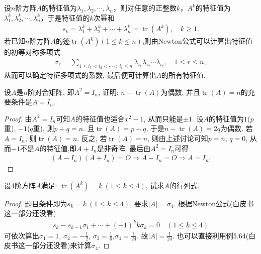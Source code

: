 \documentclass[../../main.tex]{subfiles}
\begin{document}
\begin{conclusion}
设$n$阶方阵$A$的特征值为$\lambda_1, \lambda_2, \cdots, \lambda_n$，则对任意的正整数$k$，$A^k$的特征值为$\lambda_1^k, \lambda_2^k, \cdots, \lambda_n^k$，于是特征值的$k$次幂和
\begin{align*}
s_k = \lambda_1^k + \lambda_2^k + \cdots + \lambda_n^k = \operatorname{tr}(A^k), \quad k \geqslant  1.
\end{align*}
若已知$n$阶方阵$A$的迹$\operatorname{tr}(A^k)(1\leqslant  k \leqslant  n)$,则由Newton公式可以计算出特征值的初等对称多项式
\begin{align*}
\sigma_r = \sum_{1 \leqslant  i_1 < i_2 < \cdots < i_r \leqslant  n} \lambda_{i_1} \lambda_{i_2} \cdots \lambda_{i_r}, \quad 1 \leqslant  r \leqslant  n,
\end{align*}
从而可以确定特征多项式的系数, 最后便可计算出$A$的所有特征值.
\end{conclusion}

\begin{example}
设$A$是$n$阶对合矩阵, 即$A^2 = I_n$, 证明: $n - \operatorname{tr}(A)$为偶数, 并且$\operatorname{tr}(A) = n$的充要条件是$A = I_n$.
\end{example}
\begin{proof}
由$A^2 = I_n$可知$A$的特征值也适合$x^2 - 1$, 从而只能是$\pm 1$. 设$A$的特征值为$1$($p$重), $-1$($q$重), 则$p + q = n$. 且$\operatorname{tr}(A) = p - q$, 于是$n - \operatorname{tr}(A) = 2q$为偶数. 若$A = I_n$, 则$\operatorname{tr}(A) = n$. 反之, 若$\operatorname{tr}(A) = n$, 则由上述讨论可知$p = n$, $q = 0$, 从而$-1$不是$A$的特征值,即$A + I_n$是非奇阵. 最后由$A^2=I_n$可得
\begin{align*}
(A - I_n)(A + I_n) = O\Rightarrow A-I_n=O\Rightarrow A = I_n.
\end{align*}

\end{proof}

\begin{example}
设4阶方阵$A$满足: $\operatorname{tr}(A^k) = k \ (1 \leqslant  k \leqslant  4)$, 试求$A$的行列式.
\end{example}
\begin{proof}
题目条件即为$s_k = k \ (1 \leqslant  k \leqslant  4)$, 要求$\lvert A \rvert = \sigma_4$. 根据Newton公式(白皮书这一部分还没看)
\begin{align*}
s_k - s_{k-1} \sigma_1 + \cdots + (-1)^k k \sigma_k = 0 \quad (1 \leqslant  k \leqslant  4)
\end{align*}
可依次算出$\sigma_1 = 1$, $\sigma_2 = -\frac{1}{2}$, $\sigma_3 = \frac{1}{6}$,$\sigma_4 = \frac{1}{24}.$
故$\lvert A \rvert = \frac{1}{24}$. 也可以直接利用例5.64(白皮书这一部分还没看)来计算$\sigma_4$.

\end{proof}
\end{document}
